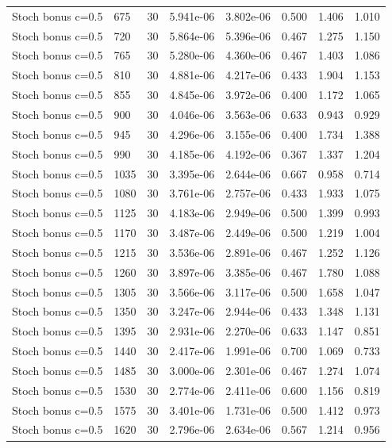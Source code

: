 \begin{scriptsize}
\begin{longtable}{llrrrrrr}
Stoch bonus c=0.5 & 675 & 30 & 5.941e-06 & 3.802e-06 & 0.500 & 1.406 & 1.010 \\
Stoch bonus c=0.5 & 720 & 30 & 5.864e-06 & 5.396e-06 & 0.467 & 1.275 & 1.150 \\
Stoch bonus c=0.5 & 765 & 30 & 5.280e-06 & 4.360e-06 & 0.467 & 1.403 & 1.086 \\
Stoch bonus c=0.5 & 810 & 30 & 4.881e-06 & 4.217e-06 & 0.433 & 1.904 & 1.153 \\
Stoch bonus c=0.5 & 855 & 30 & 4.845e-06 & 3.972e-06 & 0.400 & 1.172 & 1.065 \\
Stoch bonus c=0.5 & 900 & 30 & 4.046e-06 & 3.563e-06 & 0.633 & 0.943 & 0.929 \\
Stoch bonus c=0.5 & 945 & 30 & 4.296e-06 & 3.155e-06 & 0.400 & 1.734 & 1.388 \\
Stoch bonus c=0.5 & 990 & 30 & 4.185e-06 & 4.192e-06 & 0.367 & 1.337 & 1.204 \\
Stoch bonus c=0.5 & 1035 & 30 & 3.395e-06 & 2.644e-06 & 0.667 & 0.958 & 0.714 \\
Stoch bonus c=0.5 & 1080 & 30 & 3.761e-06 & 2.757e-06 & 0.433 & 1.933 & 1.075 \\
Stoch bonus c=0.5 & 1125 & 30 & 4.183e-06 & 2.949e-06 & 0.500 & 1.399 & 0.993 \\
Stoch bonus c=0.5 & 1170 & 30 & 3.487e-06 & 2.449e-06 & 0.500 & 1.219 & 1.004 \\
Stoch bonus c=0.5 & 1215 & 30 & 3.536e-06 & 2.891e-06 & 0.467 & 1.252 & 1.126 \\
Stoch bonus c=0.5 & 1260 & 30 & 3.897e-06 & 3.385e-06 & 0.467 & 1.780 & 1.088 \\
Stoch bonus c=0.5 & 1305 & 30 & 3.566e-06 & 3.117e-06 & 0.500 & 1.658 & 1.047 \\
Stoch bonus c=0.5 & 1350 & 30 & 3.247e-06 & 2.944e-06 & 0.433 & 1.348 & 1.131 \\
Stoch bonus c=0.5 & 1395 & 30 & 2.931e-06 & 2.270e-06 & 0.633 & 1.147 & 0.851 \\
Stoch bonus c=0.5 & 1440 & 30 & 2.417e-06 & 1.991e-06 & 0.700 & 1.069 & 0.733 \\
Stoch bonus c=0.5 & 1485 & 30 & 3.000e-06 & 2.301e-06 & 0.467 & 1.274 & 1.074 \\
Stoch bonus c=0.5 & 1530 & 30 & 2.774e-06 & 2.411e-06 & 0.600 & 1.156 & 0.819 \\
Stoch bonus c=0.5 & 1575 & 30 & 3.401e-06 & 1.731e-06 & 0.500 & 1.412 & 0.973 \\
Stoch bonus c=0.5 & 1620 & 30 & 2.796e-06 & 2.634e-06 & 0.567 & 1.214 & 0.956 \\

\end{longtable}
\end{scriptsize}
